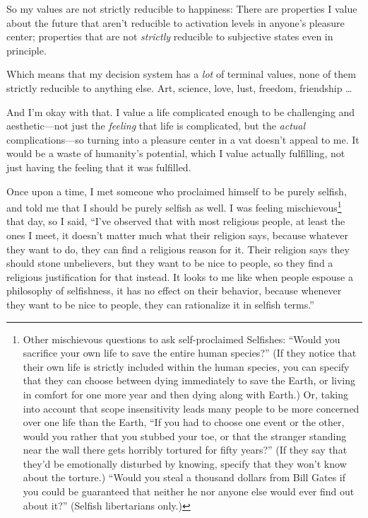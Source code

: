 {
 So my values are not strictly reducible to happiness: There are
properties I value about the future that aren't
reducible to activation levels in anyone's pleasure
center; properties that are not \textit{strictly} reducible to
subjective states even in principle.}

{
 Which means that my decision system has a \textit{lot} of terminal
values, none of them strictly reducible to anything else. Art, science,
love, lust, freedom, friendship \ldots}

{
 And I'm okay with that. I value a life complicated
enough to be challenging and aesthetic---not just the \textit{feeling}
that life is complicated, but the \textit{actual} complications---so
turning into a pleasure center in a vat doesn't appeal
to me. It would be a waste of humanity's potential,
which I value actually fulfilling, not just having the feeling that it
was fulfilled.}

\myendsectiontext


\bigskip


{
 Once upon a time, I met someone who proclaimed himself to be
purely selfish, and told me that I should be purely selfish as well. I
was feeling mischievous\footnote{Other mischievous questions to ask self-proclaimed Selfishes:
``Would you sacrifice your own life to save the entire
human species?'' (If they notice that their own life
is strictly included within the human species, you can specify that
they can choose between dying immediately to save the Earth, or living
in comfort for one more year and then dying along with Earth.) Or,
taking into account that scope insensitivity leads many people to be
more concerned over one life than the Earth, ``If you
had to choose one event or the other, would you rather that you stubbed
your toe, or that the stranger standing near the wall there gets
horribly tortured for fifty years?'' (If they say
that they'd be emotionally disturbed by knowing,
specify that they won't know about the torture.)
``Would you steal a thousand dollars from Bill Gates
if you could be guaranteed that neither he nor anyone else would ever
find out about it?'' (Selfish libertarians only.)} that day, so I said,
``I've observed that with most
religious people, at least the ones I meet, it doesn't
matter much what their religion says, because whatever they want to do,
they can find a religious reason for it. Their religion says they
should stone unbelievers, but they want to be nice to people, so they
find a religious justification for that instead. It looks to me like
when people espouse a philosophy of selfishness, it has no effect on
their behavior, because whenever they want to be nice to people, they
can rationalize it in selfish terms.'' }

